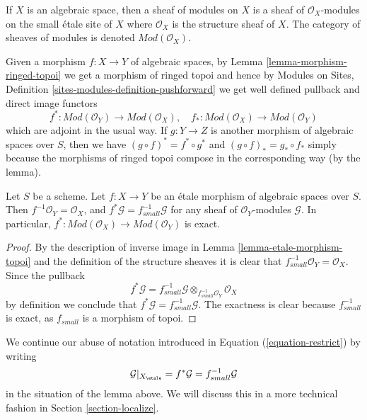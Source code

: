 \noindent
If $X$ is an algebraic space, then a sheaf of modules on $X$ is
a sheaf of $\mathcal{O}_X$-modules on the small \'etale site of $X$
where $\mathcal{O}_X$ is the structure sheaf of $X$. The category
of sheaves of modules is denoted $\textit{Mod}(\mathcal{O}_X)$.

\medskip\noindent
Given a morphism $f : X \to Y$ of algebraic spaces, by
Lemma \ref{lemma-morphism-ringed-topoi}
we get a morphism of ringed topoi and hence by
Modules on Sites, Definition \ref{sites-modules-definition-pushforward}
we get well defined pullback and direct image functors
\begin{equation}
\label{equation-push-pull}
f^* :
\textit{Mod}(\mathcal{O}_Y)
\longrightarrow
\textit{Mod}(\mathcal{O}_X), \quad
f_* :
\textit{Mod}(\mathcal{O}_X)
\longrightarrow
\textit{Mod}(\mathcal{O}_Y)
\end{equation}
which are adjoint in the usual way. If $g : Y \to Z$ is another morphism
of algebraic spaces over $S$, then we have
$(g \circ f)^* = f^* \circ g^*$ and $(g \circ f)_* = g_* \circ f_*$
simply because the morphisms of ringed topoi compose in the corresponding
way (by the lemma).

\begin{lemma}
\label{lemma-etale-exact-pullback}
Let $S$ be a scheme.
Let $f : X \to Y$ be an \'etale morphism of algebraic spaces over $S$.
Then $f^{-1}\mathcal{O}_Y = \mathcal{O}_X$, and
$f^*\mathcal{G} = f_{small}^{-1}\mathcal{G}$ for any sheaf of
$\mathcal{O}_Y$-modules $\mathcal{G}$. In particular,
$f^* : \textit{Mod}(\mathcal{O}_X) \to \textit{Mod}(\mathcal{O}_Y)$
is exact.
\end{lemma}

\begin{proof}
By the description of inverse image in Lemma \ref{lemma-etale-morphism-topoi}
and the definition of the structure sheaves it is clear that
$f_{small}^{-1}\mathcal{O}_Y = \mathcal{O}_X$. Since the pullback
$$
f^*\mathcal{G} =
f_{small}^{-1}\mathcal{G} \otimes_{f_{small}^{-1}\mathcal{O}_Y}
\mathcal{O}_X
$$
by definition we conclude that $f^*\mathcal{G} = f_{small}^{-1}\mathcal{G}$.
The exactness is clear because $f_{small}^{-1}$ is exact, as $f_{small}$
is a morphism of topoi.
\end{proof}

\noindent
We continue our abuse of notation introduced in
Equation (\ref{equation-restrict})
by writing
\begin{equation}
\label{equation-restrict-modules}
\mathcal{G}|_{X_\etale}
= f^*\mathcal{G}
= f_{small}^{-1}\mathcal{G}
\end{equation}
in the situation of the lemma above. We will discuss this in a more
technical fashion in
Section \ref{section-localize}.

